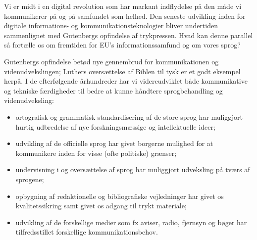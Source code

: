 \begin{multicols}{2}
\end{multicols}

\clearpage



\begin{multicols}{2}

Vi er midt i en digital revolution som har markant indflydelse \mbox{p\aa} den m\aa de vi kommunikerer \mbox{p\aa} og \mbox{p\aa} samfundet som helhed. Den seneste udvikling inden for digitale informations- og kommunikationsteknologier bliver undertiden sammenlignet med Gutenbergs opfindelse af trykpressen. Hvad kan denne parallel \mbox{s\aa} fort\ae lle os om fremtiden for EU's informationssamfund og om vores sprog?


Gutenbergs opfindelse bet\o d nye gennembrud for kommunikationen og videnudvekslingen; Luthers overs\ae ttelse af Biblen til tysk er et godt eksempel \mbox{herp\aa}. I de efterf\o lgende \aa rhundreder har vi videreudviklet b\aa de kommunikative og tekniske f\ae rdigheder til bedre at kunne h\aa ndtere sprogbehandling og videnudveksling: 

\begin{itemize}
\item ortografisk og grammatisk standardisering af de store sprog har muliggjort hurtig udbredelse af nye forskningsm\ae ssige og intellektuelle ideer;
\item udvikling af de officielle sprog har givet borgerne mulighed for at kommunikere inden for visse (ofte politiske) gr\ae nser;
\item undervisning i og overs\ae ttelse af sprog har muliggjort udveksling \mbox{p\aa} tv\ae rs af sprogene;
\item opbygning af redaktionelle og bibliografiske vejledninger har givet os kvalitetssikring samt givet os adgang til trykt materiale;
\item udvikling af de forskellige medier som fx aviser, radio, fjernsyn og b\o ger har tilfredsstillet forskellige kommunikationsbehov.
\end{itemize}


\end{multicols}
